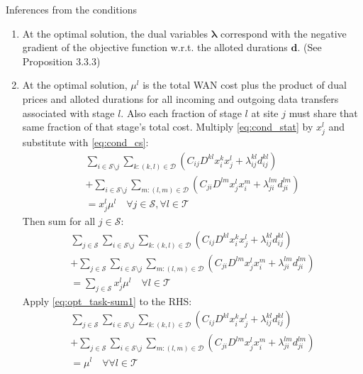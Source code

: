 Inferences from the conditions
\begin{enumerate}
	\item At the optimal solution, the dual variables $\boldsymbol{\lambda}$ correspond with the negative gradient of the objective function w.r.t. the alloted durations $\mathbf{d}$. (See \cite{bertsekas1999nonlinear} Proposition 3.3.3)
	\item At the optimal solution, $\mu^l$ is the total WAN cost plus the product of dual prices and alloted durations for all incoming and outgoing data transfers associated with stage $l$.
	Also each fraction of stage $l$ at site $j$ must share that same fraction of that stage's total cost. 
	Multiply \eqref{eq:cond_stat} by $x_j^l$ and substitute with \eqref{eq:cond_cs}:
	\begin{align}
		\sum_{i\in\mathcal{S}\setminus j} \sum_{k:(k,l)\in\mathcal{D}} (C_{ij}D^{kl}x_i^kx_j^l + \lambda_{ij}^{kl}d_{ij}^{kl}) \nonumber \\
		+ \sum_{i\in\mathcal{S}\setminus j}\sum_{m:(l,m)\in\mathcal{D}} (C_{ji}D^{lm}x_j^lx_i^m + \lambda_{ji}^{lm}d_{ji}^{lm}) \nonumber \\
		= x_j^l\mu^l
		\quad \forall j\in\mathcal{S},\forall l\in\mathcal{T}
	\end{align}
	Then sum for all $j\in\mathcal{S}$:
	\begin{align}
		\sum_{j\in\mathcal{S}}\sum_{i\in\mathcal{S}\setminus j} \sum_{k:(k,l)\in\mathcal{D}} (C_{ij}D^{kl}x_i^kx_j^l + \lambda_{ij}^{kl}d_{ij}^{kl}) \nonumber \\
		+ \sum_{j\in\mathcal{S}}\sum_{i\in\mathcal{S}\setminus j}\sum_{m:(l,m)\in\mathcal{D}} (C_{ji}D^{lm}x_j^lx_i^m + \lambda_{ji}^{lm}d_{ji}^{lm}) \nonumber \\
		= \sum_{j\in\mathcal{S}}x_j^l\mu^l
		\quad \forall l\in\mathcal{T} \nonumber
	\end{align}
	Apply \eqref{eq:opt_task-sum1} to the RHS:
	\begin{align}
		\sum_{j\in\mathcal{S}}\sum_{i\in\mathcal{S}\setminus j} \sum_{k:(k,l)\in\mathcal{D}} (C_{ij}D^{kl}x_i^kx_j^l + \lambda_{ij}^{kl}d_{ij}^{kl}) \nonumber \\
		+ \sum_{j\in\mathcal{S}}\sum_{i\in\mathcal{S}\setminus j}\sum_{m:(l,m)\in\mathcal{D}} (C_{ji}D^{lm}x_j^lx_i^m + \lambda_{ji}^{lm}d_{ji}^{lm}) \nonumber \\
		= \mu^l
		\quad \forall \forall l\in\mathcal{T}
	\end{align}
\end{enumerate}


